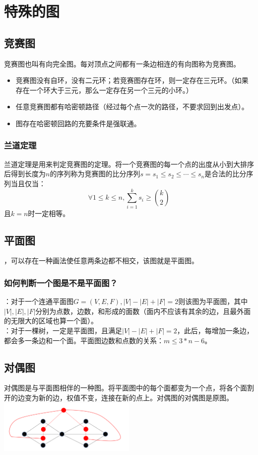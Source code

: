 \documentclass[a4paper]{book}
\begin{document}
\section{特殊的图}
\subsection{竞赛图}
竞赛图也叫有向完全图。每对顶点之间都有一条边相连的有向图称为竞赛图。
\begin{itemize}
    \item 竞赛图没有自环，没有二元环；若竞赛图存在环，则一定存在三元环。（如果存在一个环大于三元，那么一定存在另一个三元的小环。）
    \item 任意竞赛图都有哈密顿路径（经过每个点一次的路径，不要求回到出发点）。
    \item 图存在哈密顿回路的充要条件是强联通。
\end{itemize}
\subsubsection{兰道定理}
兰道定理是用来判定竞赛图的定理。将一个竞赛图的每一个点的出度从小到大排序后得到长度为$n$的序列称为竞赛图的比分序列$s={s_1\leq s_2 \leq \cdots \leq s_n}$是合法的比分序列当且仅当：
$$
\forall 1\leq k \leq n,\sum_{i=1}^{k} s_i \ge\binom{k}{2} 
$$
且$k=n$时一定相等。
\subsection{平面图}
，可以存在一种画法使任意两条边都不相交，该图就是平面图。\\
\subsubsection{如何判断一个图是不是平面图？}
：对于一个连通平面图$G=(V,E,F),|V|-|E|+|F|=2$则该图为平面图，其中$|V|,|E|,|F|$分别为点数，边数，和形成的面数（面内不应该有其余的边，且最外面的无限大的区域也算一个面）。\\
：对于一棵树，一定是平面图，且满足$|V|-|E|+|F|=2$，此后，每增加一条边，都会多一条边和一个面。平面图边数和点数的关系：$m \leq 3*n-6$。
\subsection{对偶图}
对偶图是与平面图相伴的一种图。将平面图中的每个面都变为一个点，将各个面割开的边变为新的边，权值不变，连接在新的点上。对偶图的对偶图是原图。\\
\includegraphics[width=0.5\textwidth,center]{../photo/duiou.png}
\end{document}
